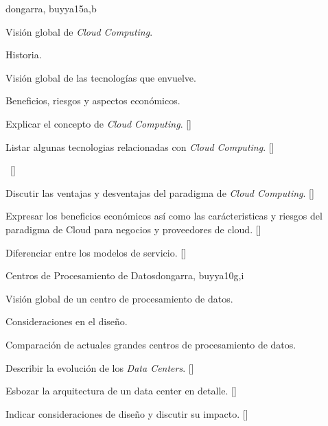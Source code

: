 \begin{syllabus}
\begin{unit}{\PDCloudComputing}{}{dongarra, buyya}{15}{a,b}
\begin{topics}
    \item Visión global de \textit{Cloud Computing}.
    \item Historia.
    \item Visión global de las tecnologías que envuelve.
    \item Beneficios, riesgos y aspectos económicos.
    \item \PDCloudComputingTopicCloud
    \item \PDCloudComputingTopicInternet
\end{topics}
\begin{learningoutcomes}
    \item Explicar el concepto de \textit{Cloud Computing}. [\Familiarity]
    \item Listar algunas tecnologias relacionadas con \textit{Cloud Computing}. [\Familiarity]
    \item \PDCloudComputingLOExplainStrategies~[\Familiarity] %
    \item Discutir las ventajas y desventajas del paradigma de \textit{Cloud Computing}.  [\Familiarity]
    \item Expresar los beneficios económicos así­ como las carácteristicas y riesgos del paradigma de Cloud para negocios y proveedores de cloud.   [\Familiarity]
    \item Diferenciar entre los modelos de servicio.   [\Usage]
\end{learningoutcomes}
\end{unit}

\begin{unit}{Centros de Procesamiento de Datos}{}{dongarra, buyya}{10}{g,i}
\begin{topics}
    \item Visión global de un centro de procesamiento de datos.
    \item Consideraciones en el diseño.
    \item Comparación de actuales grandes centros de procesamiento de datos.
\end{topics}
\begin{learningoutcomes}
    \item Describir la evolución de los \textit{Data Centers}. [\Familiarity]
    \item Esbozar la arquitectura de un data center en detalle. [\Familiarity]
    \item Indicar consideraciones de diseño y discutir su impacto.  [\Familiarity]
\end{learningoutcomes}
\end{unit}


\end{syllabus}
